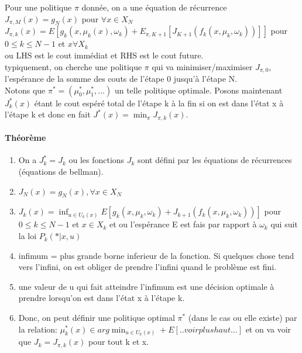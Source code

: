 \documentclass[oneside]{book}
\begin{document}
Pour une politique $\pi$ donnée, on a une équation de récurrence $J_{\pi,M}(x) = g_N(x)$ pour $\forall x \in X_N$\\

$J_{\pi,k}(x) = E[g_k(x, \mu_k(x), \omega_k) + E_{\pi, K+1}[J_{K+1}(f_k(x, \mu_k, \omega_k))]]$ pour $0\leq k \leq N-1$ et $x \forall X_k$\\

ou LHS est le cout immédiat et RHS est le cout future.\\

typiquement, on cherche une politique $\pi$ qui va minimiser/maximiser $J_{\pi, 0}$, l'espérance de la somme des couts de l'étape 0 jusqu'à l'étape N. \\

Notons que $\pi^* = (\mu^*_0, \mu^*_1,...)$ un telle politique optimale. Posons maintenant $J^*_k(x)$ étant le cout espéré total de l'étape k à la fin si on est dans l'état x à l'étape k et donc en fait $J^*(x) = \min_\pi J_{\pi,k}(x)$. \\

\paragraph{Théorème}
\begin{enumerate}
\item On a $J_k^* = J_k$ ou les fonctions $J_k$ sont défini par les équations de récurrences (équations de bellman).

\item $J_N(x) = g_N(x), \forall x \in X_N$

\item $J_k(x) = \inf_{u \in U_k(x)} E[g_k(x, \mu_k, \omega_k) + J_{k+1}(f_k(x,\mu_k, \omega_k))]$ pour $0\leq k \leq N-1$ et $x \in X_k$  et ou l'espérance E est fais par rapport à $\omega_k$ qui suit la loi $P_k(*|x,u)$

\item infimum = plus grande borne inferieur de la fonction. Si quelques chose tend vers l'infini, on est obliger de prendre l'infini quand le problème est fini.

\item une valeur de u qui fait atteindre l'infimum est une décision optimale à prendre lorsqu'on est dans l'état x à l'étape k. 

\item Donc, on peut définir une politique optimal $\pi^*$ (dans le cas ou elle existe) par la relation: $\mu_k^*(x) \in arg\min_{u \in U_k(x)} + E[.. voir plus haut...]$ et on va voir que $J_k = J_{\pi, k}(x)$ pour tout k et x. 
\end{enumerate}
\end{document}
